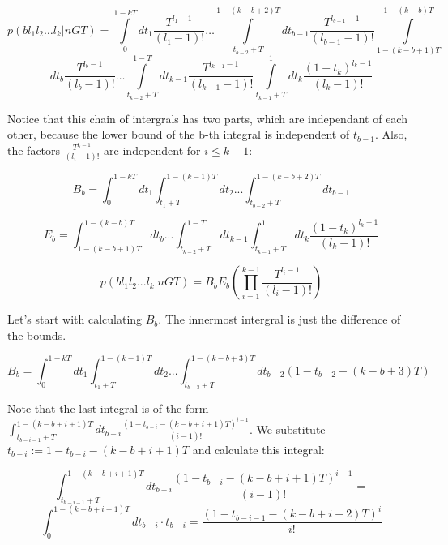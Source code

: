 \documentclass{../note}
\begin{document}
\begin{solution}
\begin{equation*}
p(b l_1 l_2 \ldots l_k | n G T) = \int\limits_{0}^{1-kT} dt_1 \frac{T^{l_1 - 1}}{(l_1 - 1)!} \ldots \int\limits_{t_{b-2}+T}^{1-(k-b+2)T} dt_{b-1} \frac{T^{l_{b-1} - 1}}{(l_{b-1} - 1)!} \int\limits_{1-(k-b+1)T}^{1-(k-b)T}
\end{equation*}
\begin{equation*}
dt_b \frac{T^{l_b - 1}}{(l_b - 1)!} \ldots \int\limits_{t_{k-2} + T}^{1-T} dt_{k-1} \frac{T^{l_{k-1} - 1}}{(l_{k-1} - 1)!} \int\limits_{t_{k-1} + T}^{1} dt_k \frac{(1-t_k)^{l_k - 1}}{(l_k - 1)!}
\end{equation*}

Notice that this chain of intergrals has two parts, which are independant of each other, because the lower bound of the b-th integral is independent of $t_{b-1}$. Also, the factors $\frac{T^{l_i - 1}}{(l_i - 1)!}$ are independent for $i \leqslant k - 1$:

\begin{equation*}
B_b = \int_{0}^{1-kT} dt_1 \int_{t_1+T}^{1-(k-1)T} dt_2 ... \int_{t_{b-2}+T}^{1-(k-b+2)T} dt_{b-1}
\end{equation*}

\begin{equation*}
E_b = \int_{1-(k-b+1)T}^{1-(k-b)T} dt_b ... \int_{t_{k-2} + T}^{1-T} dt_{k-1} \int_{t_{k-1} + T}^{1} dt_k \frac{(1-t_k)^{l_k - 1}}{(l_k - 1)!}
\end{equation*}

\begin{equation*}
p(b l_1 l_2 ... l_k | n G T) = B_b E_b \left(\prod_{i=1}^{k-1} \frac{T^{l_i - 1}}{(l_i - 1)!}\right)
\end{equation*}

Let's start with calculating $B_b$. The innermost intergral is just the difference of the bounds.

\begin{equation*}
B_b = \int_{0}^{1-kT} dt_1 \int_{t_1+T}^{1-(k-1)T} dt_2 ... \int_{t_{b-3}+T}^{1-(k-b+3)T} dt_{b-2} (1 - t_{b-2} - (k - b + 3)T)
\end{equation*}

Note that the last integral is of the form $\int_{t_{b-i-1}+T}^{1-(k-b+i+1)T} dt_{b-i} \frac{(1 - t_{b-i} - (k - b + i + 1)T)^{i-1}}{(i-1)!}$. We substitute $t_{b-i} := 1 - t_{b-i} - (k - b + i + 1)T$ and calculate this integral:

\begin{equation*}
\int_{t_{b-i-1}+T}^{1-(k-b+i+1)T} dt_{b-i} \frac{(1 - t_{b-i} - (k - b + i + 1)T)^{i-1}}{(i-1)!} = 
\end{equation*}
\begin{equation*}
\int_{0}^{1-(k-b+i+1)T} dt_{b-i} \cdot t_{b-i} = \frac{(1 - t_{b-i-1} - (k - b + i + 2)T)^i}{i!}
\end{equation*}


\end{solution}
\end{document}
